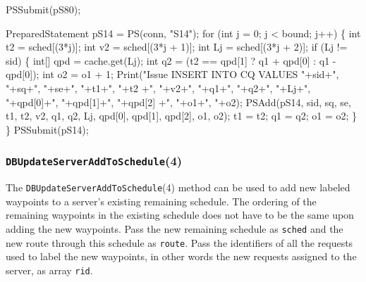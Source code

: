 \documentclass{article}
\def\nwendcode{\endtrivlist \endgroup}      %
\let\nwdocspar=\par
\theoremstyle{definition}                   %
\begin{document}
PSSubmit(pS80);
\nwendcode{}\nwdocspar
\nwenddocs{}\endmoddef{}
PreparedStatement pS14 = PS(conn, "S14");
for (int j = 0; j < bound; j++) \{
  int t2 = sched[(3*j)];
  int v2 = sched[(3*j + 1)];
  int Lj = sched[(3*j + 2)];
  if (Lj != sid) \{
    int[] qpd = cache.get(Lj);
    int q2 = (t2 == qpd[1] ? q1 + qpd[0] : q1 - qpd[0]);
    int o2 = o1 + 1;
    Print("Issue INSERT INTO CQ VALUES "+sid+", "+sq+", "+se+", "+t1+", "+t2
        +", "+v2+", "+q1+", "+q2+", "+Lj+", "+qpd[0]+", "+qpd[1]+", "+qpd[2]
        +", "+o1+", "+o2);
    PSAdd(pS14, sid, sq, se, t1, t2, v2, q1, q2, Lj,
          qpd[0], qpd[1], qpd[2], o1, o2);
    t1 = t2;
    q1 = q2;
    o1 = o2;
  \}
\}
PSSubmit(pS14);
\nwendcode{}\nwdocspar

\subsubsection{{\tt{}\protect{}DBUpdateServerAddToSchedule}(4)}
The {\tt{}\protect{}DBUpdateServerAddToSchedule}(4) method can be used to add new labeled
waypoints to a server's existing remaining schedule. The ordering of the
remaining waypoints in the existing schedule does not have to be the same
upon adding the new waypoints. Pass the new remaining schedule as {\tt{}sched} and
the new route through this schedule as {\tt{}route}. Pass the identifiers of all
the requests used to label the new waypoints, in other words the new
requests assigned to the server, as array {\tt{}rid}.
\end{document}
